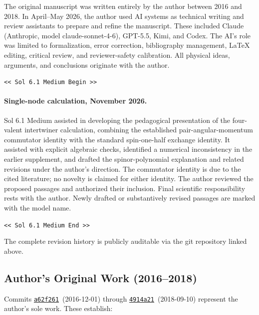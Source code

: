 \documentclass[preprint]{SciPost}
\theoremstyle{plain} %
\newcommand{\GPTBegin}{\par\noindent\textcolor{GPTMarker}{\texttt{\textless\textless{} Sol 6.1 Medium Begin \textgreater\textgreater}}\par}
\newcommand{\GPTEnd}{\par\noindent\textcolor{GPTMarker}{\texttt{\textless\textless{} Sol 6.1 Medium End \textgreater\textgreater}}\par}
\begin{document}
The original manuscript was written entirely by the author between 2016 and 2018. In April--May 2026, the author used AI systems as technical writing and review assistants to prepare and refine the manuscript. These included Claude (Anthropic, model claude-sonnet-4-6), GPT-5.5, Kimi, and Codex. The AI's role was limited to formalization, error correction, bibliography management, \LaTeX{} editing, critical review, and reviewer-safety calibration. All physical ideas, arguments, and conclusions originate with the author.

\GPTBegin{}

\paragraph{Single-node calculation, November 2026.}
Sol 6.1 Medium assisted in developing the pedagogical presentation of the
four-valent intertwiner calculation, combining the established
pair-angular-momentum commutator identity with the standard spin-one-half
exchange identity. It assisted with explicit algebraic checks, identified
a numerical inconsistency in the earlier supplement, and drafted the
spinor-polynomial explanation and related revisions under the author's
direction. The commutator identity is due to the cited literature; no
novelty is claimed for either identity. The author reviewed the proposed
passages and authorized their inclusion. Final scientific responsibility
rests with the author. Newly drafted or substantively revised passages
are marked with the model name.

\GPTEnd{}


The complete revision history is publicly auditable via the git repository linked above.

\subsection*{Author's Original Work (2016--2018)}

Commits \href{https://github.com/space-cadet/timesarrow/commit/a62f261}{\texttt{a62f261}}~(2016-12-01) through \href{https://github.com/space-cadet/timesarrow/commit/4914a21}{\texttt{4914a21}}~(2018-09-10) represent the author's sole work. These establish:
\end{document}
